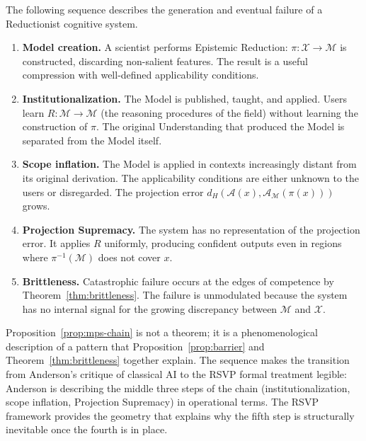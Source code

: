 \documentclass[12pt, a4paper, oneside]{book}
\newcommand{\Adm}{\mathcal{A}}
\newcommand{\X}{\mathcal{X}}
\newcommand{\M}{\mathcal{M}}
\newcommand{\proj}{\pi}
\newcommand{\dH}{d_H}
\begin{document}
\begin{proposition}
\label{prop:mps-chain}
The following sequence describes the generation and eventual failure of
a Reductionist cognitive system.
\begin{enumerate}
  \item \textbf{Model creation.} A scientist performs Epistemic Reduction:
    $\proj : \X \to \M$ is constructed, discarding non-salient features.
    The result is a useful compression with well-defined applicability
    conditions.
  \item \textbf{Institutionalization.} The Model is published,
    taught, and applied. Users learn $R : \M \to \M$ (the reasoning
    procedures of the field) without learning the construction of
    $\proj$. The original Understanding that produced the Model
    is separated from the Model itself.
  \item \textbf{Scope inflation.} The Model is applied in contexts
    increasingly distant from its original derivation. The applicability
    conditions are either unknown to the users or disregarded.
    The projection error $\dH(\Adm(x), \Adm_\M(\proj(x)))$ grows.
  \item \textbf{Projection Supremacy.} The system has no representation
    of the projection error. It applies $R$ uniformly, producing
    confident outputs even in regions where $\proj^{-1}(\M)$ does not
    cover $x$.
  \item \textbf{Brittleness.} Catastrophic failure occurs at the edges
    of competence by Theorem~\ref{thm:brittleness}. The failure is
    unmodulated because the system has no internal signal for the
    growing discrepancy between $\M$ and $\X$.
\end{enumerate}
\end{proposition}

\begin{remark}
Proposition~\ref{prop:mps-chain} is not a theorem; it is a phenomenological
description of a pattern that Proposition~\ref{prop:barrier} and
Theorem~\ref{thm:brittleness} together explain.
The sequence makes the transition from Anderson's critique of
classical AI to the RSVP formal treatment legible: Anderson is describing
the middle three steps of the chain (institutionalization, scope inflation,
Projection Supremacy) in operational terms.
The RSVP framework provides the geometry that explains why the fifth
step is structurally inevitable once the fourth is in place.
\end{remark}
\end{document}
